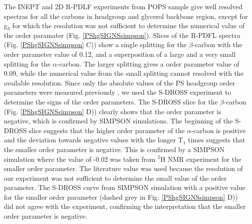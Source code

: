 \documentclass[aps,prl,superscriptaddress,twocolumn]{revtex4}
\begin{document}
The INEPT and 2D R-PDLF experiments from POPS sample give well resolved spectras for all the
carbons in headgroup and glycerol backbone region, except for g$_3$ for which the resolution
was not sufficient to determine the numerical value of the order paramater (Fig. \ref{PShgSIGNSsimpson}).
Slices of the R-PDFL spectra (Fig. \ref{PShgSIGNSsimpson} C)) 
show a single splitting for the $\beta$-carbon with the order parameter value of 0.12,
and a superposition of a large and a very small splitting for the $\alpha$-carbon.
The larger splitting gives a order parameter value of 0.09, while the numerical value
from the small splitting cannot resolved with the available resolution.
Since only the absolute values of the PS headgroup order parameters were measured
previously \cite{browning80,roux91}, we used the S-DROSS experiment \cite{??} to determine the signs of
the order parameters. The S-DROSS slice for the $\beta$-carbon (Fig. \ref{PShgSIGNSsimpson} D)) clearly shows that the
order parameter is negative, which is confirmed by SIMPSON simulations.
The beginning of the S-DROSS slice suggests that the higher order parameter of
the $\alpha$-carbon is positive and the deviation towards negative values with the longer T$_1$ times suggests
that the smaller order parameter is negative. This is confirmed by a SIMPSON simulation
where the value of -0.02 was taken from $^2$H NMR experiment \cite{roux91} for the smaller order parameter.
The literature value was used because the
resolution of our experiment was not sufficient to determine the
small value of the order parameter. The S-DROSS curve from
SIMPSON simulation with a positive value for the smaller order parameter
(dashed grey in Fig. \ref{PShgSIGNSsimpson} D)) did not agree with the experiment, 
confirming the interpretation that the smaller order parameter is negative.
\end{document}

